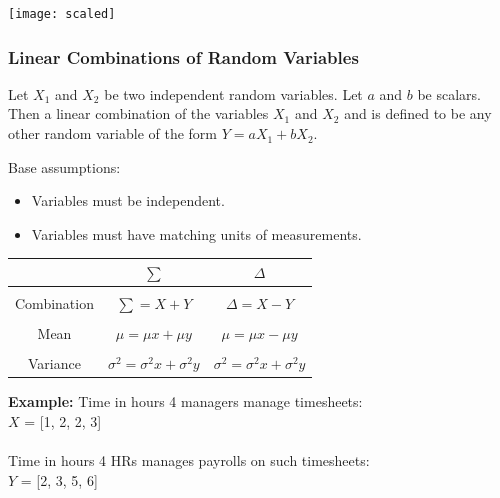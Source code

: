 \documentclass{article}
\begin{document}
\texttt{[image: scaled]}

\subsubsection{Linear Combinations of Random Variables}
Let $X_1$ and $X_2$ be two independent random variables. Let $a$ and $b$ be scalars. Then a linear combination of the variables $X_1$ and $X_2$ and is defined to be any other random variable of the form $Y= aX_1 + bX_2$. 

Base assumptions:
\begin{itemize}
    \item Variables must be independent.
    \item Variables must have matching units of measurements.
\end{itemize}

\begin{center}
\begin{tabular}{|c|c|c|}
\hline
 & $\sum$ & $\Delta$  \\ \hline
&&\\[-1em]
Combination & $\sum = X + Y $ & $\Delta = X - Y$ \\ \hline
&&\\[-1em]
Mean & $\mu = \mu x + \mu y $ & $\mu = \mu x - \mu y$ \\ \hline
&&\\[-1em]
Variance & $\sigma^2 = \sigma^2 x + \sigma^2 y$ & $\sigma^2 = \sigma^2 x + \sigma^2 y$ \\
\hline
\end{tabular}
\end{center}

\textbf{Example:}
Time in hours 4 managers manage timesheets: \\ 
$X$ = [1, 2, 2, 3] \\ 
\mbox{} \\
Time in hours 4 HRs manages payrolls on such timesheets: \\ 
$Y$ = [2, 3, 5, 6] \\ 
\mbox{} \\
\end{document}
